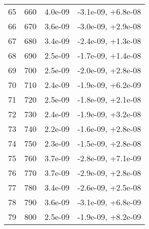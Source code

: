 \begin{table}
\begin{adjustbox}{width=1\textwidth/2}
\begin{tabular}{|c|c|c|c|}
\cline{1-4}
65 & 660 & 4.0e-09 & -3.1e-09, +6.8e-08 \\
\cline{1-4}
66 & 670 & 3.6e-09 & -3.0e-09, +2.9e-08 \\
\cline{1-4}
67 & 680 & 3.4e-09 & -2.4e-09, +1.3e-08 \\
\cline{1-4}
68 & 690 & 2.5e-09 & -1.7e-09, +1.4e-08 \\
\cline{1-4}
69 & 700 & 2.5e-09 & -2.0e-09, +2.8e-08 \\
\cline{1-4}
70 & 710 & 2.4e-09 & -1.9e-09, +6.2e-09 \\
\cline{1-4}
71 & 720 & 2.5e-09 & -1.8e-09, +2.1e-08 \\
\cline{1-4}
72 & 730 & 2.4e-09 & -1.9e-09, +3.2e-08 \\
\cline{1-4}
73 & 740 & 2.2e-09 & -1.6e-09, +2.8e-08 \\
\cline{1-4}
74 & 750 & 2.3e-09 & -1.5e-09, +2.8e-08 \\
\cline{1-4}
75 & 760 & 3.7e-09 & -2.8e-09, +7.1e-09 \\
\cline{1-4}
76 & 770 & 3.7e-09 & -2.9e-09, +2.8e-08 \\
\cline{1-4}
77 & 780 & 3.4e-09 & -2.6e-09, +2.5e-08 \\
\cline{1-4}
78 & 790 & 3.6e-09 & -3.1e-09, +6.8e-09 \\
\cline{1-4}
79 & 800 & 2.5e-09 & -1.9e-09, +8.2e-09 \\
\cline{1-4}
\end{tabular}
\end{adjustbox}
\end{table}


